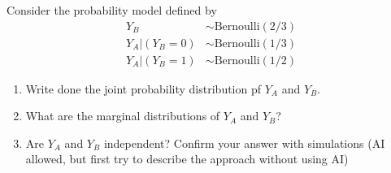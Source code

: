 \begin{exercise}
Consider the probability model defined by
\begin{align*}
Y_B &\sim \text{Bernoulli}(2/3) \\
Y_A|(Y_B=0) &\sim \text{Bernoulli}(1/3) \\
Y_A|(Y_B=1) &\sim \text{Bernoulli}(1/2)
\end{align*}

\begin{enumerate}[label=(\alph*)]
\item Write done the joint probability distribution pf $Y_A$ and $Y_B$. 
\item What are the marginal distributions of $Y_A$ and $Y_B$?
\item Are $Y_A$ and $Y_B$ independent? Confirm your answer with simulations (AI allowed, but first try to describe the approach without using AI)
\end{enumerate}
%

\end{exercise}




